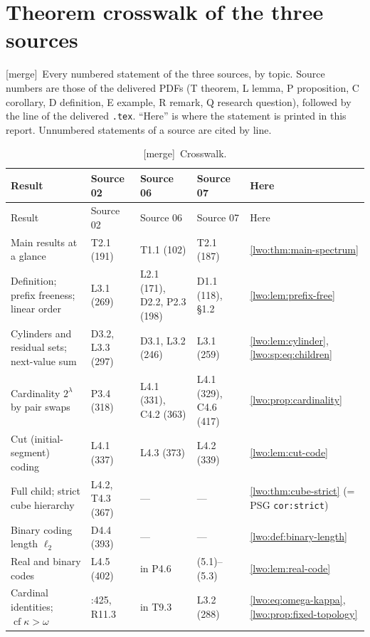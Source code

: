\documentclass[11pt,a4paper]{article}
\theoremstyle{definition}
\theoremstyle{remark}
\newcommand{\cf}{\operatorname{cf}}
\newcommand{\bl}{\ell_2}
\newcommand{\merge}{\textsf{[merge]}}
\begin{document}
\section{Theorem crosswalk of the three sources}\label{lwo:app:crosswalk}
\merge\ Every numbered statement of the three sources, by topic. Source
numbers are those of the delivered PDFs (T theorem, L lemma, P proposition, C
corollary, D definition, E example, R remark, Q research question), followed
by the line of the delivered \texttt{.tex}. ``Here'' is where the statement is
printed in this report. Unnumbered statements of a source are cited by
line.

{\small
\renewcommand{\arraystretch}{1.12}
\begin{longtable}{@{}>{\raggedright\arraybackslash}p{}>{\raggedright\arraybackslash}p{}>{\raggedright\arraybackslash}p{}>{\raggedright\arraybackslash}p{}>{\raggedright\arraybackslash}p{}@{}}
\caption{\merge\ Crosswalk.}\label{lwo:tab:crosswalk}\\
\toprule
Result & Source 02 & Source 06 & Source 07 & Here\\
\midrule
\endfirsthead
\toprule
Result & Source 02 & Source 06 & Source 07 & Here\\
\midrule
\endhead
\bottomrule
\endfoot
Main results at a glance & T2.1 (191) & T1.1 (102) & T2.1 (187) & \ref{lwo:thm:main-spectrum}\\
Definition; prefix freeness; linear order & L3.1 (269) & L2.1 (171), D2.2, P2.3 (198) & D1.1 (118), §1.2 & \ref{lwo:lem:prefix-free}\\
Cylinders and residual sets; next-value sum & D3.2, L3.3 (297) & D3.1, L3.2 (246) & L3.1 (259) & \ref{lwo:lem:cylinder}, \eqref{lwo:sp:eq:children}\\
Cardinality $2^\lambda$ by pair swaps & P3.4 (318) & L4.1 (331), C4.2 (363) & L4.1 (329), C4.6 (417) & \ref{lwo:prop:cardinality}\\
Cut (initial-segment) coding & L4.1 (337) & L4.3 (373) & L4.2 (339) & \ref{lwo:lem:cut-code}\\
Full child; strict cube hierarchy & L4.2, T4.3 (367) & --- & --- & \ref{lwo:thm:cube-strict} (= PSG \texttt{cor:strict})\\
Binary coding length $\bl$ & D4.4 (393) & --- & --- & \ref{lwo:def:binary-length}\\
Real and binary codes & L4.5 (402) & in P4.6 & (5.1)--(5.3) & \ref{lwo:lem:real-code}\\
Cardinal identities; $\cf\kappa>\omega$ & 02:425, R11.3 & in T9.3 & L3.2 (288) & \eqref{lwo:eq:omega-kappa}, \ref{lwo:prop:fixed-topology}\\

\end{longtable}}
\end{document}
